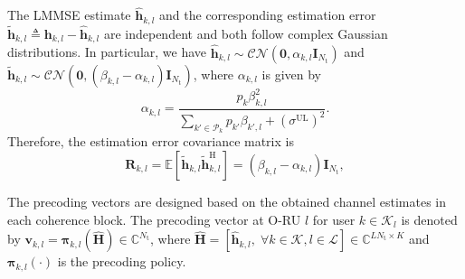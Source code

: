 \documentclass[10pt, conference]{IEEEtran}
\begin{document}
The LMMSE estimate $\hat{\mathbf{h}}_{k,l}$ and the corresponding estimation error $\tilde{\mathbf{h}}_{k,l} \triangleq \mathbf{h}_{k,l} - \hat{\mathbf{h}}_{k,l}$ are independent and both follow complex Gaussian distributions. In particular, we have $\hat{\mathbf{h}}_{k,l} \sim \mathcal{CN}\left(\mathbf{0}, \alpha_{k,l}\mathbf{I}_{N_\mathrm{t}}\right)$ and $\tilde{\mathbf{h}}_{k,l} \sim \mathcal{CN}\left(\mathbf{0}, \left(\beta_{k,l} - \alpha_{k,l}\right)\mathbf{I}_{N_\mathrm{t}}\right)$, where $\alpha_{k,l}$ is given by
\begin{equation}
\alpha_{k,l}
=
\frac{p_k \beta_{k,l}^2}
{\sum\limits_{k'\in\mathcal{P}_k} p_{k'}\beta_{k',l} + \left(\sigma^{\mathrm{UL}}\right)^2}.
\end{equation}
Therefore, the estimation error covariance matrix is
\begin{equation}\label{eq:estimation_error_covariance}
\mathbf{R}_{k,l}
=
\mathbb{E}\left[\tilde{\mathbf{h}}_{k,l}\tilde{\mathbf{h}}_{k,l}^\mathrm{H}\right]
=
\left(\beta_{k,l} - \alpha_{k,l}\right)\mathbf{I}_{N_\mathrm{t}},
\end{equation}

The precoding vectors are designed based on the obtained channel estimates in each coherence block. The precoding vector at O-RU $l$ for user $k\in\mathcal{K}_l$ is denoted by $\mathbf{v}_{k,l} = \boldsymbol{\pi}_{k,l}\left(\hat{\mathbf{H}}\right) \in\mathbb{C}^{N_\textrm{t}}$, where $\hat{\mathbf{H}} = \left[\hat{\mathbf{h}}_{k,l},\;\forall k \in \mathcal{K}, l \in \mathcal{L}\right] \in \mathbb{C}^{LN_\textrm{t} \times K}$ and $\boldsymbol{\pi}_{k,l}(\cdot)$ is the precoding policy.
\end{document}

